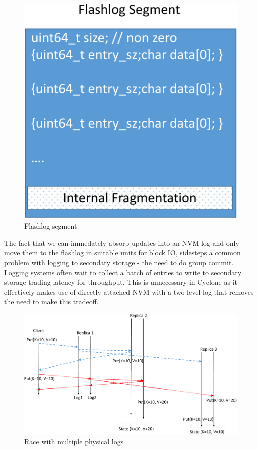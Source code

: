 \documentclass[10pt, preprint, nonatbib]{sigplanconf}
\begin{document}
\begin{figure}
  \centering
  \includegraphics[scale=0.3]{figures2/flashlog_page.pdf}
  \caption{Flashlog segment}
  \label{fig:flashlog_page}
\end{figure}

The fact that we can immedately absorb updates into an NVM log and only move
them to the flashlog in suitable units for block IO, sidesteps a common problem
with logging to secondary storage - the need to do group commit. Logging systems
often wait to collect a batch of entries to write to secondary storage trading
latency for throughput. This is unnecessary in Cyclone as it effectively makes
use of directly attached NVM with a two level log that removes the need to make
this tradeoff.

\begin{figure}
  \centering
  \includegraphics[scale=0.3]{figures2/race.pdf}
  \caption{Race with multiple physical logs}
  \label{fig:race}
\end{figure}
\end{document}
